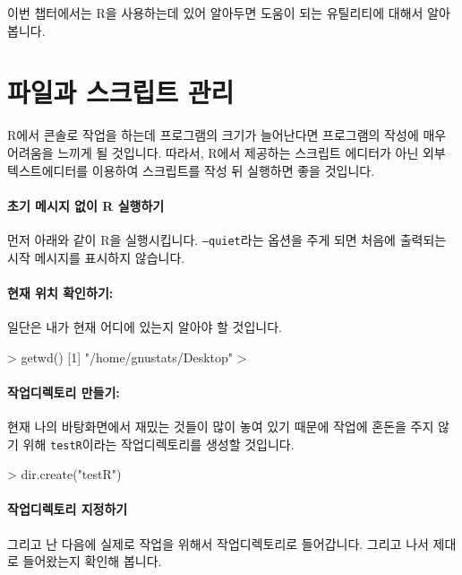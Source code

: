 
이번 챕터에서는 R을 사용하는데 있어 알아두면 도움이 되는 유틸리티에 대해서 알아봅니다.


\section{파일과 스크립트 관리}

R에서 콘솔로 작업을 하는데 프로그램의 크기가 늘어난다면 프로그램의 작성에 매우 어려움을 느끼게 될 것입니다.
따라서, R에서 제공하는 스크립트 에디터가 아닌 외부 텍스트에디터를 이용하여 스크립트를 작성 뒤 실행하면 좋을 것입니다.

\paragraph{초기 메시지 없이 R 실행하기}
먼저 아래와 같이 R을 실행시킵니다. 
\texttt{--quiet}라는 옵션을 주게 되면 처음에 출력되는 시작 메시지를 표시하지 않습니다. 

\begin{Schunk}
\end{Schunk}

\paragraph{현재 위치 확인하기:}
일단은 내가 현재 어디에 있는지 알아야 할 것입니다.
\begin{Schunk}
\begin{Soutput}
> getwd()
[1] "/home/gnustats/Desktop"
> 
\end{Soutput}
\end{Schunk}

\paragraph{작업디렉토리 만들기:}
현재 나의 바탕화면에서 재밌는 것들이 많이 놓여 있기 때문에 작업에 혼돈을 주지 않기 위해 \texttt{testR}이라는 작업디렉토리를 생성할 것입니다. 
\begin{Schunk}
\begin{Soutput}
> dir.create("testR")
\end{Soutput}
\end{Schunk}

\paragraph{작업디렉토리 지정하기}
그리고 난 다음에 실제로 작업을 위해서 작업디렉토리로 들어갑니다. 
그리고 나서 제대로 들어왔는지 확인해 봅니다. 


